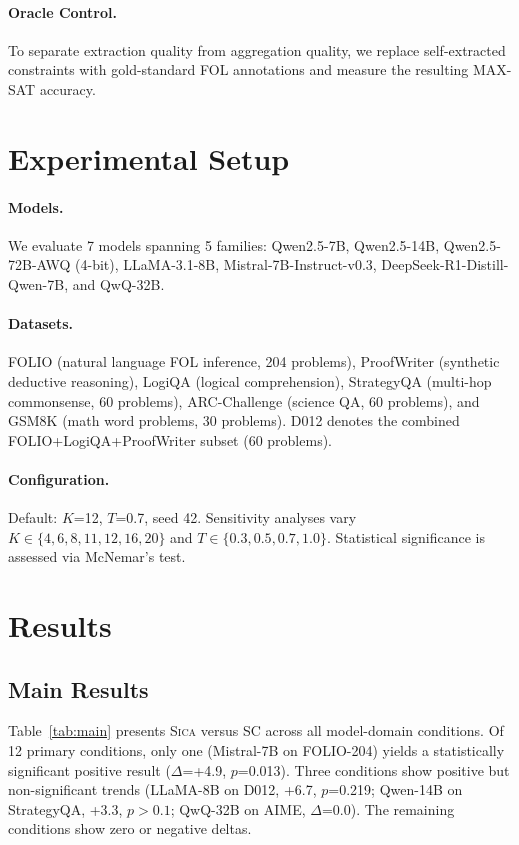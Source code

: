 \documentclass[11pt,a4paper]{article}
\newcommand{\sica}{\textsc{Sica}}
\newcommand{\pp}{\text{pp}}
\begin{document}
\paragraph{Oracle Control.}
To separate extraction quality from aggregation quality, we replace self-extracted constraints with gold-standard FOL annotations and measure the resulting MAX-SAT accuracy.

\section{Experimental Setup}

\paragraph{Models.}
We evaluate 7 models spanning 5 families: Qwen2.5-7B, Qwen2.5-14B, Qwen2.5-72B-AWQ (4-bit), LLaMA-3.1-8B, Mistral-7B-Instruct-v0.3, DeepSeek-R1-Distill-Qwen-7B, and QwQ-32B.

\paragraph{Datasets.}
FOLIO \citep{han2022folio} (natural language FOL inference, 204 problems), ProofWriter \citep{tafjord2021proofwriter} (synthetic deductive reasoning), LogiQA \citep{liu2023logiqa} (logical comprehension), StrategyQA \citep{geva2021strategyqa} (multi-hop commonsense, 60 problems), ARC-Challenge \citep{clark2018arc} (science QA, 60 problems), and GSM8K \citep{cobbe2021gsm8k} (math word problems, 30 problems). D012 denotes the combined FOLIO+LogiQA+ProofWriter subset (60 problems).

\paragraph{Configuration.}
Default: $K$=12, $T$=0.7, seed 42. Sensitivity analyses vary $K \in \{4, 6, 8, 11, 12, 16, 20\}$ and $T \in \{0.3, 0.5, 0.7, 1.0\}$. Statistical significance is assessed via McNemar's test.

\section{Results}

\subsection{Main Results}

Table~\ref{tab:main} presents \sica{} versus SC across all model-domain conditions.
Of 12 primary conditions, only one (Mistral-7B on FOLIO-204) yields a statistically significant positive result ($\Delta$=+4.9\pp{}, $p$=0.013).
Three conditions show positive but non-significant trends (LLaMA-8B on D012, +6.7\pp{}, $p$=0.219; Qwen-14B on StrategyQA, +3.3\pp{}, $p > 0.1$; QwQ-32B on AIME, $\Delta$=0.0).
The remaining conditions show zero or negative deltas.
\end{document}
